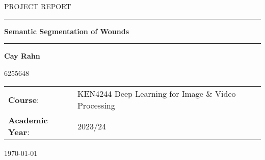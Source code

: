 \documentclass[parskip=half, headings=normal, fontsize=10pt]{scrarticle}
\begin{document}
\begin{titlepage}
	\thispagestyle{empty}
	\centering

	\begin{minipage}[t]{\textwidth}
	
		\centering
		\Large{\uppercase{Project report}}
	
		\vspace{2cm}
	
		\rule{\textwidth}{1pt}
	
		\vspace{0.5cm}
	
		\textbf{\huge{Semantic Segmentation of Wounds}}
	
		\rule{\textwidth}{1pt}
	
		\vspace{5cm}
	\end{minipage}
	
	\begin{minipage}[t]{0.8\textwidth}
		\centering
	
		\large{\textbf{Cay Rahn}}
	
		\large{6255648}

		\vspace{3cm}
	
		\large{
			\noindent\begin{tabular}{@{}ll}
			\textbf{Course}:& KEN4244 Deep Learning for Image \& Video Processing\\
			\textbf{Academic Year}:& 2023/24
			\end{tabular}
		}
		
		\vspace{4cm}
		\large{\today}
	\end{minipage}
	
	
\end{titlepage}
\clearpage
\setcounter{page}{1}








\printbibliography
\end{document}
